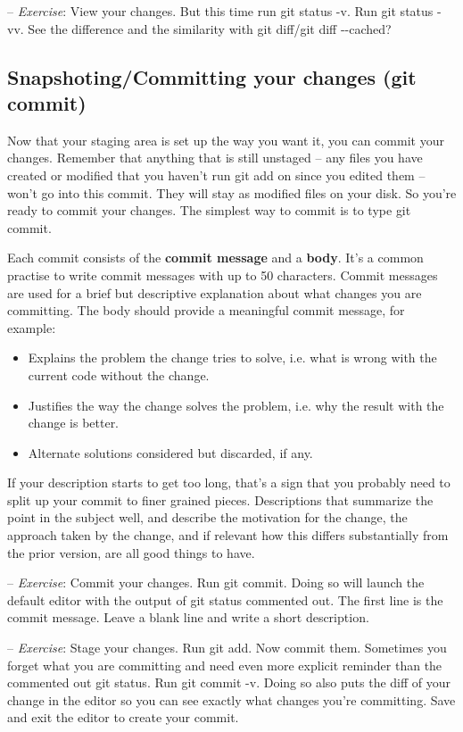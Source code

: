\documentclass[12pt,a4]{article}
\newcommand{\ilcode}[1]{\textcolor[RGB]{160, 110, 220}{#1}}
\begin{document}
{\sf -- \emph{Exercise}:} View your changes. But this time run \ilcode{git
status -v}. Run \ilcode{git status -vv}. See the difference and the similarity
with \ilcode{git diff}/\ilcode{git diff -{}-cached}?

\subsection{Snapshoting/Committing your changes (git commit)}
Now that your staging area is set up the way you want it, you can commit your
changes. Remember that anything that is still unstaged -- any files you have
created or modified that you haven’t run \ilcode{git add} on since you edited
them -- won’t go into this commit. They will stay as modified files on your
disk. So you’re ready to commit your changes. The simplest way to commit is to
type \ilcode{git commit}.

Each commit consists of the {\bf commit message} and a {\bf body}. It's a common
practise to write commit messages with up to 50 characters. Commit messages are
used for a brief but descriptive explanation about what changes you are
committing. The body should provide a meaningful commit message, for example:
\begin{itemize}
\item Explains the problem the change tries to solve, i.e. what is wrong with
	the current code without the change.
\item Justifies the way the change solves the problem, i.e. why the result with
	the change is better.
\item Alternate solutions considered but discarded, if any.
\end{itemize}
If your description starts to get too long, that’s a sign that you probably need
to split up your commit to finer grained pieces. Descriptions that summarize the
point in the subject well, and describe the motivation for the change, the
approach taken by the change, and if relevant how this differs substantially
from the prior version, are all good things to have.

{\sf -- \emph{Exercise}:} Commit your changes. Run \ilcode{git commit}. Doing so
will launch the default editor with the output of \ilcode{git status} commented
out. The first line is the commit message. Leave a blank line and write a short
description.

{\sf -- \emph{Exercise}:} Stage your changes. Run \ilcode{git add}. Now commit
them. Sometimes you forget what you are committing and need even more explicit
reminder than the commented out \ilcode{git status}. Run \ilcode{git commit -v}.
Doing so also puts the diff of your change in the editor so you can see exactly
what changes you're committing. Save and exit the editor to create your commit.
\end{document}
